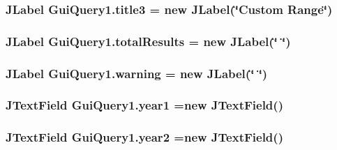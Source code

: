 \subsubsection[{\texorpdfstring{title3}{title3}}]{\setlength{\rightskip}{0pt plus 5cm}J\+Label Gui\+Query1.\+title3 = new J\+Label(\char`\"{}Custom Range\char`\"{})\hspace{0.3cm}{\ttfamily [protected]}}\hypertarget{classGuiQuery1_a8e28412d9118fc61abde587c3bf7574f}{}\label{classGuiQuery1_a8e28412d9118fc61abde587c3bf7574f}
\subsubsection[{\texorpdfstring{total\+Results}{totalResults}}]{\setlength{\rightskip}{0pt plus 5cm}J\+Label Gui\+Query1.\+total\+Results = new J\+Label(\char`\"{} \char`\"{})\hspace{0.3cm}{\ttfamily [protected]}}\hypertarget{classGuiQuery1_a515a1ac46f1362d811dd6e0c27d842fc}{}\label{classGuiQuery1_a515a1ac46f1362d811dd6e0c27d842fc}
\subsubsection[{\texorpdfstring{warning}{warning}}]{\setlength{\rightskip}{0pt plus 5cm}J\+Label Gui\+Query1.\+warning = new J\+Label(\char`\"{} \char`\"{})\hspace{0.3cm}{\ttfamily [protected]}}\hypertarget{classGuiQuery1_a382ff58e8c0283a69f6d88249b1fe496}{}\label{classGuiQuery1_a382ff58e8c0283a69f6d88249b1fe496}
\subsubsection[{\texorpdfstring{year1}{year1}}]{\setlength{\rightskip}{0pt plus 5cm}J\+Text\+Field Gui\+Query1.\+year1 =new J\+Text\+Field()\hspace{0.3cm}{\ttfamily [protected]}}\hypertarget{classGuiQuery1_a8659841dac2a5dcf9b367a7b19a19a52}{}\label{classGuiQuery1_a8659841dac2a5dcf9b367a7b19a19a52}
\subsubsection[{\texorpdfstring{year2}{year2}}]{\setlength{\rightskip}{0pt plus 5cm}J\+Text\+Field Gui\+Query1.\+year2 =new J\+Text\+Field()\hspace{0.3cm}{\ttfamily [protected]}}\hypertarget{classGuiQuery1_a012c8e122c0a83d0af4ca51d03932c37}{}\label{classGuiQuery1_a012c8e122c0a83d0af4ca51d03932c37}
